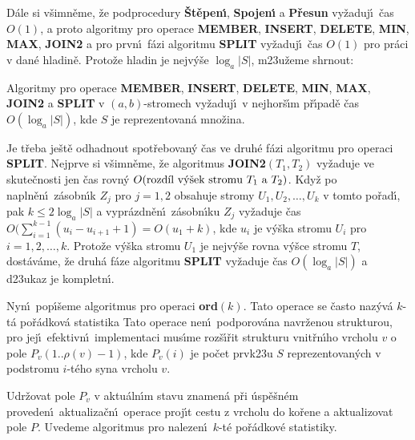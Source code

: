 \flushpar D\'ale si v\v simn\v eme, \v ze podprocedury {\bf \v St\v epen\'\i }, {\bf Spojen\'\i} a {\bf P\v re\-sun }
vy\v zaduj\'\i\ \v cas $O(1)$, a proto algoritmy pro operace {\bf MEMBER}, 
{\bf INSERT}, {\bf DELETE}, {\bf MIN}, {\bf MAX}, {\bf JOIN2} a pro prvn\'\i\ f\'azi algoritmu 
{\bf SPLIT} vy\v zaduj\'\i\ \v cas $O(1)$ pro pr\'aci v dan\'e hladin\v e.  Proto\v ze 
hladin je nejv\'y\v se $\log_a|S|$, m\accent23u\v zeme shrnout: 


Algoritmy pro operace {\bf MEMBER}, {\bf INSERT}, 
{\bf DE\-LETE}, {\bf MIN}, {\bf MAX}, {\bf JOIN2} a {\bf SPLIT} v $
(a,b)$-stromech vy\-\v zaduj\'\i\ 
v nejhor\v s\'\i m p\v r\'\i pad\v e \v cas $O(\log_a|S|)$, kde $
S$ je 
re\-pre\-zen\-tovan\'a mno\v zina.  
\endproclaim


\flushpar Je t\v reba je\v st\v e odhadnout spot\v rebovan\'y \v cas ve druh\'e f\'azi 
algoritmu pro operaci {\bf SPLIT}. Nejprve si v\v simn\v eme, \v ze 
algoritmus {\bf JOIN2$(T_1,T_2)$} vy\v zaduje ve skute\v cnosti jen \v cas 
rovn\'y 
$O(\text{\rm rozd\'\i l v\'y\v sek strom\accent23u }T_1\text{\rm \ a }
T_2)$. Kdy\v z po napln\v en\'\i\ 
z\'asobn\'\i k $Z_j$ pro $j=1,2$ obsahuje stromy $U_1,U_2,\dots,U_
k$ v tomto 
po\v rad\'\i , pak $k\le 2\log_a|S|$ a vypr\'azdn\v en\'\i\ z\'asobn\'\i ku $
Z_j$ 
vy\v zaduje 
\v cas $O(\sum_{i=1}^{k-1}(u_i-u_{i+1}+1)=O(u_1+k)$, kde $u_i$ je v\'y\v ska stromu $
U_i$ pro 
$i=1,2,\dots,k$. Proto\v ze v\'y\v ska stromu $U_1$ je nejv\'y\v se rovna v\'y\v sce 
stromu $T$, dost\'av\'ame, \v ze druh\'a f\'aze algoritmu {\bf SPLIT} vy\v zaduje 
\v cas $O(\log_a|S|)$ a d\accent23ukaz je kompletn\'\i . 
\medskip

\flushpar Nyn\'\i\ pop\'\i\v seme algoritmus pro operaci {\bf ord$
(k)$}. Tato 
operace se \v casto naz\'yv\'a $k$-t\'a po\v r\'adko\-v\'a statistika
Tato operace nen\'\i\ podporov\'ana navr\v zenou 
strukturou, pro jej\'\i\ efektivn\'\i\ implementaci mus\'\i me 
roz\v s\'\i\v rit strukturu vnit\v rn\'\i ho vrcholu $v$ o pole\newline 
$P_v(1..\rho (v)-1)$, kde $P_v(i)$ je po\v cet prvk\accent23u $S$ reprezentovan\'ych 
v podstromu $i$-t\'eho syna vrcholu $v$.
\smallskip
 
\flushpar Udr\v zovat pole $P_v$ v aktu\'aln\'\i m stavu znamen\'a p\v ri \'usp\v e\v sn\'em 
pro\-veden\'\i\ aktualiza\v cn\'\i\ operace proj\'\i t cestu z vrcholu do ko\v re\-ne 
a aktualizovat pole $P$. Uvedeme algoritmus pro 
naleze\-n\'\i\ $k$-t\'e po\v r\'adkov\'e statistiky.
\medskip

